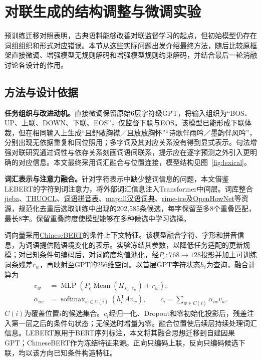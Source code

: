 \section{对联生成的结构调整与微调实验}

预训练迁移对照表明，古典语料能够改善对联监督学习的起点，但初始模型仍存在词组组织和形式对应错误。本节从这些实际问题出发介绍最终方法，随后比较原框架直接微调、增强模型无规则解码和增强模型规则约束解码，并结合最后一轮消融讨论各设计的作用。

\subsection{方法与设计依据}

\textbf{任务组织与改进动机。}直接微调保留原始6层字符级GPT，将输入组织为“BOS、UP、上联、DOWN、下联、EOS”，仅监督下联与EOS。该模型已能形成下联体裁，但在相同输入上生成“且舒敞胸襟／且放放胸怀”“诗歌伴雨吟／墨韵伴风吟”，分别出现无依据重复和同位照用；多字词及其对应关系没有得到显式表示。句法增强对联研究通过词性与依存关系刻画词语间联系\cite{song}，提示应在逐字预测之外引入更明确的对应信息。本文最终采用词汇融合与位置连接，模型结构见图~\ref{fig:lexical}。

\textbf{词汇表示与注意力融合。}针对字符表示中缺少整词信息的问题，本文借鉴LEBERT的字符到词注意力，将外部词汇信息注入Transformer中间层\cite{lebert}。词库整合\href{https://github.com/fxsjy/jieba}{jieba}、\href{https://github.com/thunlp/THUOCL}{THUOCL}、\href{https://github.com/mozillazg/phrase-pinyin-data}{词语拼音表}、\href{https://github.com/mapull/chinese-dictionary}{mapull汉语词典}、\href{https://github.com/iDvel/rime-ice}{rime-ice}及\href{https://github.com/thunlp/OpenHowNet}{OpenHowNet}等资源，规范化去重后选取训练中出现的202,585条候选，每字保留至多8个重叠匹配，最长8字。保留重叠跨度使模型能够在多种候选中学习选择。

词向量采用\href{https://huggingface.co/ShannonAI/ChineseBERT-base}{ChineseBERT}的条件上下文特征。该模型融合字符、字形和拼音信息\cite{chinesebert}，为词语提供随语境变化的表示。实验冻结其参数，以降低任务适配的更新规模；对已知条件句编码后，对词跨度均值池化，经$P_c:768\to128$投影并加上可训练词条残差$r_w$，再映射至GPT的256维空间。以首层GPT字符状态$h_i$为查询，融合计算为
\begin{align}
 v_w&=\operatorname{MLP}\!\left(P_c\operatorname{Mean}(H_{s_w:e_w})+r_w\right),\label{eq:word}\\
 \alpha_{iw}&=\operatorname{softmax}_{w\in C(i)}(h_i^{\mathsf T}Av_w),\qquad
 c_i=\sum_{w\in C(i)}\alpha_{iw}v_w.\label{eq:lexical}
\end{align}
$C(i)$为覆盖位置$i$的候选集合。$c_i$经归一化、Dropout和零初始化投影后，残差注入第一层之后的条件句状态；无候选时增量为零。融合位置使后续层持续处理词汇信息。LEBERT原用于BERT序列标注，本文将其融合思想迁移到自建因果GPT；ChineseBERT作为冻结特征来源。正向只编码上联，反向只编码候选下联，均以该方向已知条件构造特征。

